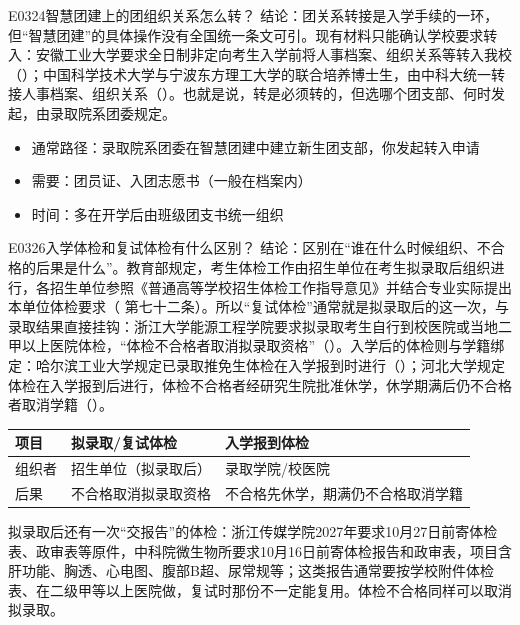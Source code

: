 \begin{qa}{E0324}{智慧团建上的团组织关系怎么转？}
结论：团关系转接是入学手续的一环，但“智慧团建”的具体操作没有全国统一条文可引。现有材料只能确认学校要求转入：安徽工业大学要求全日制非定向考生入学前将人事档案、组织关系等转入我校（）；中国科学技术大学与宁波东方理工大学的联合培养博士生，由中科大统一转接人事档案、组织关系（）。也就是说，转是必须转的，但选哪个团支部、何时发起，由录取院系团委规定。

\begin{itemize}
  \item 通常路径：录取院系团委在智慧团建中建立新生团支部，你发起转入申请
  \item 需要：团员证、入团志愿书（一般在档案内）
  \item 时间：多在开学后由班级团支书统一组织
\end{itemize}
\end{qa}

\begin{qa}{E0326}{入学体检和复试体检有什么区别？}
结论：区别在“谁在什么时候组织、不合格的后果是什么”。教育部规定，考生体检工作由招生单位在考生拟录取后组织进行，各招生单位参照《普通高等学校招生体检工作指导意见》并结合专业实际提出本单位体检要求（ 第七十二条）。所以“复试体检”通常就是拟录取后的这一次，与录取结果直接挂钩：浙江大学能源工程学院要求拟录取考生自行到校医院或当地二甲以上医院体检，“体检不合格者取消拟录取资格”（）。入学后的体检则与学籍绑定：哈尔滨工业大学规定已录取推免生体检在入学报到时进行（）；河北大学规定体检在入学报到后进行，体检不合格者经研究生院批准休学，休学期满后仍不合格者取消学籍（）。

\par\vspace{2pt}\nobreak\begin{center}\footnotesize
\begin{tabularx}{\textwidth}{>{\raggedright\arraybackslash}X>{\raggedright\arraybackslash}X>{\raggedright\arraybackslash}X}
\toprule
\textbf{项目} & \textbf{拟录取/复试体检} & \textbf{入学报到体检} \\ \midrule
组织者 & 招生单位（拟录取后） & 录取学院/校医院 \\
后果 & 不合格取消拟录取资格 & 不合格先休学，期满仍不合格取消学籍 \\
\bottomrule
\end{tabularx}
\end{center}\vspace{2pt}\par
拟录取后还有一次“交报告”的体检：浙江传媒学院2027年要求10月27日前寄体检表、政审表等原件，中科院微生物所要求10月16日前寄体检报告和政审表，项目含肝功能、胸透、心电图、腹部B超、尿常规等；这类报告通常要按学校附件体检表、在二级甲等以上医院做，复试时那份不一定能复用。体检不合格同样可以取消拟录取。

\end{qa}

